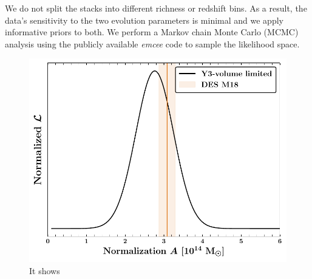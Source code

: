 We do not split the stacks into different richness or redshift bins.
As a result, the data's sensitivity to the two evolution parameters is minimal and we apply informative priors to both.
We perform a Markov chain Monte Carlo (MCMC) analysis %
using the publicly available \emph{emcee} \citep{mackey13} code to sample the likelihood space.
\begin{figure}
\includegraphics[width=\linewidth]{figs/M_rich_fitting_y3_v6_4_22_full_vl_JODY.pdf}
\caption{It shows}
\end{figure}